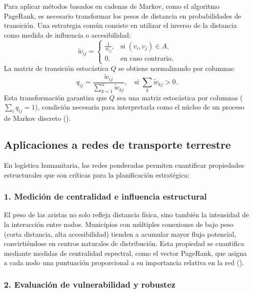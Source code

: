 \documentclass[
  spanish,
  us-letterpaper,
]{scrreprt}
\numberwithin{equation}{section}
\begin{document}
Para aplicar métodos basados en cadenas de Markov, como el algoritmo
PageRank, es necesario transformar los pesos de distancia en
probabilidades de transición. Una estrategia común consiste en utilizar
el inverso de la distancia como medida de influencia o accesibilidad: \[
\tilde{w}_{ij} = 
\begin{cases}
\displaystyle \frac{1}{w_{ij}}, & \text{si } (v_i, v_j) \in A, \\
0, & \text{en caso contrario}.
\end{cases}
\] La matriz de transición estocástica \(Q\) se obtiene normalizando por
columnas: \[
q_{ij} = \frac{\tilde{w}_{ij}}{\sum_{k=1}^n \tilde{w}_{kj}}, \quad \text{si } \sum_{k} \tilde{w}_{kj} > 0.
\] Esta transformación garantiza que \(Q\) sea una matriz estocástica
por columnas (\(\sum_i q_{ij} = 1\)), condición necesaria para
interpretarla como el núcleo de un proceso de Markov discreto
().

\subsection{Aplicaciones a redes de transporte
terrestre}\label{aplicaciones-a-redes-de-transporte-terrestre}

En logística humanitaria, las redes ponderadas permiten cuantificar
propiedades estructurales que son críticas para la planificación
estratégica:

\subsubsection{1. Medición de centralidad e influencia
estructural}\label{mediciuxf3n-de-centralidad-e-influencia-estructural}

El peso de las aristas no solo refleja distancia física, sino también la
intensidad de la interacción entre nodos. Municipios con múltiples
conexiones de bajo peso (corta distancia, alta accesibilidad) tienden a
acumular mayor flujo potencial, convirtiéndose en centros naturales de
distribución. Esta propiedad se cuantifica mediante medidas de
centralidad espectral, como el vector PageRank, que asigna a cada nodo
una puntuación proporcional a su importancia relativa en la red
().

\subsubsection{2. Evaluación de vulnerabilidad y
robustez}\label{evaluaciuxf3n-de-vulnerabilidad-y-robustez}
\end{document}
